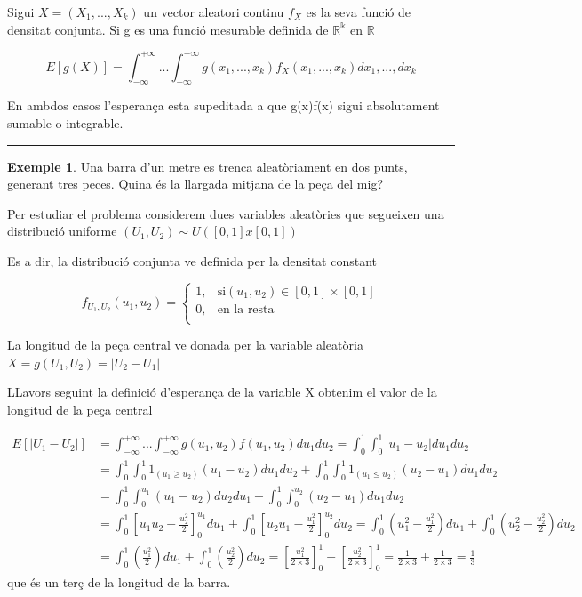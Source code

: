 \documentclass[
  catalan,
]{article}
\theoremstyle{definition}
\theoremstyle{definition}
\newtheorem{example}{Exemple}[section]
\theoremstyle{definition}
\theoremstyle{definition}
\theoremstyle{remark}
\begin{document}
Sigui \(X=(X_1,...,X_k)\) un vector aleatori continu \(f_X\) es la seva funció de densitat conjunta. Si g es una funció mesurable definida de \(\mathbb{R^k}\) en \(\mathbb{R}\)

\[
 E[g(X)]=\int_{-\infty}^{+\infty}...\int_{-\infty}^{+\infty}  g(x_1,...,x_k)f_X(x_1,...,x_k)dx_1,...,dx_k
 \]

En ambdos casos l'esperança esta supeditada a que \textbar g(x)f(x)\textbar{} sigui absolutament sumable o integrable.

\begin{center}\rule{0.5\linewidth}{0.5pt}\end{center}

\begin{example}
Una barra d'un metre es trenca aleatòriament en dos punts, generant tres peces. Quina és la llargada mitjana de la peça del mig?

Per estudiar el problema considerem dues variables aleatòries que segueixen una distribució uniforme \((U_1,U_2)\sim U([0,1]x[0,1])\)

Es a dir, la distribució conjunta ve definida per la densitat constant

\[
f_{U_1, U_2}(u_1,u_2)=  
\begin{cases}
1,          & \text{si} (u_1,u_2) \in [0,1] \times [0,1] \\
0,          & \text{en la resta }  \\
\end{cases}
\]

La longitud de la peça central ve donada per la variable aleatòria \(X=g(U_1,U_2)=|U_2-U_1|\)

LLavors seguint la definició d'esperança de la variable X obtenim el valor de la longitud de la peça central

\[
\begin{aligned}
E[|U_1-U_2|] &=\int_{-\infty}^{+\infty}...\int_{-\infty}^{+\infty}  g(u_1,u_2)f(u_1,u_2)du_1du_2=\int_{0}^{1}\int_{0}^{1} |u_1-u_2|du_1du_2  \\
&=\int_0^1\int_0^1 1_{(u_1 \geq u_2)} (u_1-u_2) du_1du_2 +\int_0^1\int_0^1 1_{(u_1 \leq u_2)} (u_2-u_1) du_1du_2  \\
&=\int_0^1\int_0^{u_1}(u_1-u_2) du_2du_1 + \int_{0}^{1}\int_{0}^{u_2}(u_2-u_1) du_1du_2  \\
&= \int_0^1 \left [u_1u_2 - \frac {u_2^2}{2}  \right]_0^{u_1}du_1+\int_0^1 \left [u_2u_1 - \frac {u_1^2}{2}  \right]_0^{u_2}du_2=\int_0^1 ( u_1^2 - \frac {u_1^2}{2})  du_1+\int_0^1 ( u_2^2 - \frac {u_2^2}{2})  du_2 \\
&=\int_0^1 ( \frac {u_1^2}{2})  du_1+\int_0^1 (  \frac {u_2^2}{2})  du_2= \left [ \frac {u_1^2}{2 \times 3} \right]_0^1+\left [ \frac {u_2^2}{2 \times 3} \right]_0^1= \frac {1}{2 \times 3}+\frac {1}{2 \times 3}=\frac {1}{3} 
\end{aligned}
\]
que és un terç de la longitud de la barra.
\end{example}
\end{document}
